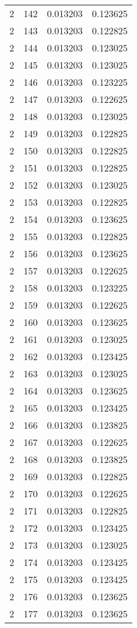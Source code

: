 \begin{longtable}{rrrr}
2 & 142 & 0.013203 & 0.123625 \\
2 & 143 & 0.013203 & 0.122825 \\
2 & 144 & 0.013203 & 0.123025 \\
2 & 145 & 0.013203 & 0.123025 \\
2 & 146 & 0.013203 & 0.123225 \\
2 & 147 & 0.013203 & 0.122625 \\
2 & 148 & 0.013203 & 0.123025 \\
2 & 149 & 0.013203 & 0.122825 \\
2 & 150 & 0.013203 & 0.122825 \\
2 & 151 & 0.013203 & 0.122825 \\
2 & 152 & 0.013203 & 0.123025 \\
2 & 153 & 0.013203 & 0.122825 \\
2 & 154 & 0.013203 & 0.123625 \\
2 & 155 & 0.013203 & 0.122825 \\
2 & 156 & 0.013203 & 0.123625 \\
2 & 157 & 0.013203 & 0.122625 \\
2 & 158 & 0.013203 & 0.123225 \\
2 & 159 & 0.013203 & 0.122625 \\
2 & 160 & 0.013203 & 0.123625 \\
2 & 161 & 0.013203 & 0.123025 \\
2 & 162 & 0.013203 & 0.123425 \\
2 & 163 & 0.013203 & 0.123025 \\
2 & 164 & 0.013203 & 0.123625 \\
2 & 165 & 0.013203 & 0.123425 \\
2 & 166 & 0.013203 & 0.123825 \\
2 & 167 & 0.013203 & 0.122625 \\
2 & 168 & 0.013203 & 0.123825 \\
2 & 169 & 0.013203 & 0.122825 \\
2 & 170 & 0.013203 & 0.122625 \\
2 & 171 & 0.013203 & 0.122825 \\
2 & 172 & 0.013203 & 0.123425 \\
2 & 173 & 0.013203 & 0.123025 \\
2 & 174 & 0.013203 & 0.123425 \\
2 & 175 & 0.013203 & 0.123425 \\
2 & 176 & 0.013203 & 0.123625 \\
2 & 177 & 0.013203 & 0.123625 \\

\end{longtable}
